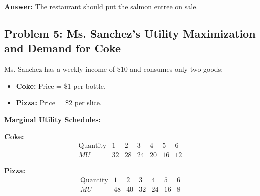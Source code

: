 \documentclass[12pt]{article}
\begin{document}
\textbf{Answer:} The restaurant should put the salmon entree on sale.

\subsection*{Problem 5: Ms. Sanchez’s Utility Maximization and Demand for Coke}
Ms. Sanchez has a weekly income of \$10 and consumes only two goods:
\begin{itemize}[noitemsep]
    \item \textbf{Coke:} Price = \$1 per bottle.
    \item \textbf{Pizza:} Price = \$2 per slice.
\end{itemize}

\textbf{Marginal Utility Schedules:}

\noindent\textbf{Coke:}
\[
    \begin{array}{c|cccccc}
        \text{Quantity} & 1  & 2  & 3  & 4  & 5  & 6  \\\hline
        MU              & 32 & 28 & 24 & 20 & 16 & 12
    \end{array}
\]

\noindent\textbf{Pizza:}
\[
    \begin{array}{c|cccccc}
        \text{Quantity} & 1  & 2  & 3  & 4  & 5  & 6 \\\hline
        MU              & 48 & 40 & 32 & 24 & 16 & 8
    \end{array}
\]
\end{document}
